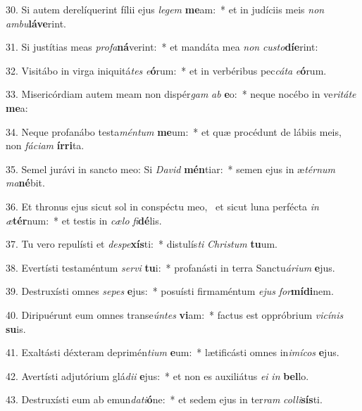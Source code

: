 30. Si autem derelíquerint fílii ejus \textit{le}\textit{gem} \textbf{me}am:~*  et in judíciis meis \textit{non} \textit{am}\textit{bu}\textbf{lá}\textbf{ve}rint.\

31. Si justítias meas \textit{pro}\textit{fa}\textbf{ná}verint:~*  et mandáta mea \textit{non} \textit{cus}\textit{to}\textbf{dí}\textbf{e}rint:\

32. Visitábo in virga iniquitá\textit{tes} \textit{e}\textbf{ó}rum:~*  et in verbéribus pec\textit{cá}\textit{ta} \textit{e}\textbf{ó}rum.\

33. Misericórdiam autem meam non dispér\textit{gam} \textit{ab} \textbf{e}o:~*  neque nocébo in ve\textit{ri}\textit{tá}\textit{te} \textbf{me}a:\

34. Neque profanábo testa\textit{mén}\textit{tum} \textbf{me}um:~*  et quæ procédunt de lábiis meis, non \textit{fá}\textit{ci}\textit{am} \textbf{ír}\textbf{ri}ta.\

35. Semel jurávi in sancto meo: Si \textit{Da}\textit{vid} \textbf{mén}tiar:~*  semen ejus in æ\textit{tér}\textit{num} \textit{ma}\textbf{né}bit.\

36. Et thronus ejus sicut sol in conspéctu meo, \dag\  et sicut luna perfécta \textit{in} \textit{æ}\textbf{tér}num:~*  et testis in \textit{cæ}\textit{lo} \textit{fi}\textbf{dé}lis.\

37. Tu vero repulísti et \textit{de}\textit{spe}\textbf{xís}ti:~*  distulís\textit{ti} \textit{Chris}\textit{tum} \textbf{tu}um.\

38. Evertísti testaméntum \textit{ser}\textit{vi} \textbf{tu}i:~*  profanásti in terra Sanctu\textit{á}\textit{ri}\textit{um} \textbf{e}jus.\

39. Destruxísti omnes \textit{se}\textit{pes} \textbf{e}jus:~*  posuísti firmaméntum \textit{e}\textit{jus} \textit{for}\textbf{mí}\textbf{di}nem.\

40. Diripuérunt eum omnes transe\textit{ún}\textit{tes} \textbf{vi}am:~*  factus est oppróbrium \textit{vi}\textit{cí}\textit{nis} \textbf{su}is.\

41. Exaltásti déxteram deprimén\textit{ti}\textit{um} \textbf{e}um:~*  lætificásti omnes in\textit{i}\textit{mí}\textit{cos} \textbf{e}jus.\

42. Avertísti adjutórium glá\textit{di}\textit{i} \textbf{e}jus:~*  et non es auxiliátus \textit{e}\textit{i} \textit{in} \textbf{bel}lo.\

43. Destruxísti eum ab emun\textit{da}\textit{ti}\textbf{ó}ne:~*  et sedem ejus in ter\textit{ram} \textit{col}\textit{li}\textbf{sís}ti.\

